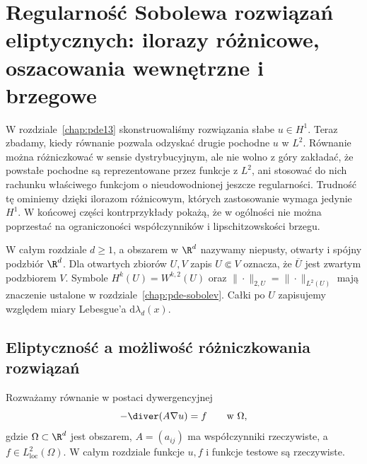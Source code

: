 \chapter[Regularność Sobolewa rozwiązań eliptycznych]{Regularność Sobolewa rozwiązań eliptycznych: ilorazy różnicowe, oszacowania wewnętrzne i brzegowe}
\label{chap:pde15}

W rozdziale~\ref{chap:pde13} skonstruowaliśmy rozwiązania słabe
$u\in H^1$. Teraz zbadamy, kiedy równanie pozwala odzyskać drugie
pochodne $u$ w $L^2$. Równanie można różniczkować w sensie
dystrybucyjnym, ale nie wolno z góry zakładać, że powstałe
pochodne są reprezentowane przez funkcje z $L^2$, ani stosować
do nich rachunku właściwego funkcjom o nieudowodnionej jeszcze
regularności. Trudność tę ominiemy dzięki ilorazom różnicowym,
których zastosowanie wymaga jedynie $H^1$. W końcowej części
kontrprzykłady pokażą, że w ogólności nie można poprzestać
na ograniczoności współczynników i lipschitzowskości brzegu.

W całym rozdziale $d\ge1$, a obszarem w $\R^d$ nazywamy niepusty,
otwarty i spójny podzbiór $\R^d$. Dla otwartych zbiorów
$U,V$ zapis $U\Subset V$ oznacza, że $\overline U$ jest zwartym
podzbiorem $V$. Symbole $H^k(U)=W^{k,2}(U)$ oraz
$\|\cdot\|_{2,U}=\|\cdot\|_{L^2(U)}$ mają znaczenie ustalone
w rozdziale~\ref{chap:pde-sobolev}. Całki po $U$ zapisujemy względem
miary Lebesgue'a $\mathrm d\lambda_d(x)$.

\section{Eliptyczność a możliwość różniczkowania rozwiązań}
\label{sec:pde15-model}
Rozważamy równanie w postaci dywergencyjnej
\begin{equation}\label{eq:pde15-basic}
 -\diver(A\nabla u)=f\qquad\text{w }\Omega,
\end{equation}
gdzie $\Omega\subset\R^d$ jest obszarem, $A=(a_{ij})$ ma współczynniki
rzeczywiste, a $f\in L^2_{\mathrm{loc}}(\Omega)$.
W całym rozdziale funkcje $u,f$ i funkcje testowe są rzeczywiste.

